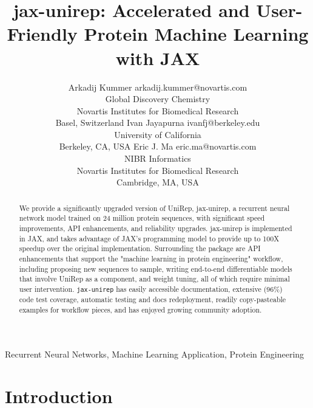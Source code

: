 \documentclass[twoside,11pt]{article}
\begin{document}
\title{jax-unirep: Accelerated and User-Friendly Protein Machine Learning with JAX}

\author{\name Arkadij Kummer \email arkadij.kummer@novartis.com \\
    \addr Global Discovery Chemistry\\
    Novartis Institutes for Biomedical Research\\
    Basel, Switzerland
    \AND
    \name Ivan Jayapurna \email ivanfj@berkeley.edu \\
    \addr University of California\\
    Berkeley, CA, USA
    \AND
    \name Eric J. Ma \email eric.ma@novartis.com \\
    \addr NIBR Informatics\\
    Novartis Institutes for Biomedical Research\\
    Cambridge, MA, USA
}

\editor{}

\maketitle

\begin{abstract}%
We provide a significantly upgraded version of UniRep, jax-unirep,
a recurrent neural network model trained on 24 million protein sequences,
with significant speed improvements,
API enhancements,
and reliability upgrades.
jax-unirep is implemented in JAX,
and takes advantage of JAX's programming model
to provide up to 100X speedup over the original implementation.
Surrounding the package are API enhancements
that support the "machine learning in protein engineering" workflow,
including proposing new sequences to sample,
writing end-to-end differentiable models that involve UniRep as a component,
and weight tuning,
all of which require minimal user intervention.
\verb|jax-unirep| has easily accessible documentation,
extensive (96\%) code test coverage,
automatic testing and docs redeployment,
readily copy-pasteable examples for workflow pieces,
and has enjoyed growing community adoption.
\end{abstract}

\begin{keywords}
  Recurrent Neural Networks, Machine Learning Application, Protein Engineering
\end{keywords}

\section{Introduction}
\end{document}
